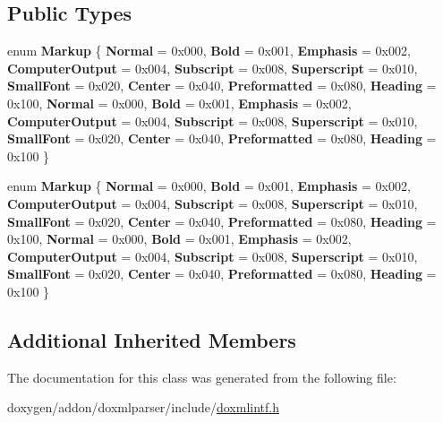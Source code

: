 \subsection*{Public Types}
\begin{DoxyCompactItemize}
\item 
\mbox{\label{class_i_doc_markup_a0f98f192394be48c4fb41b3b79e021ba}} 
enum {\bfseries Markup} \{ \newline
{\bfseries Normal} = 0x000, 
{\bfseries Bold} = 0x001, 
{\bfseries Emphasis} = 0x002, 
{\bfseries Computer\+Output} = 0x004, 
\newline
{\bfseries Subscript} = 0x008, 
{\bfseries Superscript} = 0x010, 
{\bfseries Small\+Font} = 0x020, 
{\bfseries Center} = 0x040, 
\newline
{\bfseries Preformatted} = 0x080, 
{\bfseries Heading} = 0x100, 
{\bfseries Normal} = 0x000, 
{\bfseries Bold} = 0x001, 
\newline
{\bfseries Emphasis} = 0x002, 
{\bfseries Computer\+Output} = 0x004, 
{\bfseries Subscript} = 0x008, 
{\bfseries Superscript} = 0x010, 
\newline
{\bfseries Small\+Font} = 0x020, 
{\bfseries Center} = 0x040, 
{\bfseries Preformatted} = 0x080, 
{\bfseries Heading} = 0x100
 \}
\item 
\mbox{\label{class_i_doc_markup_a0f98f192394be48c4fb41b3b79e021ba}} 
enum {\bfseries Markup} \{ \newline
{\bfseries Normal} = 0x000, 
{\bfseries Bold} = 0x001, 
{\bfseries Emphasis} = 0x002, 
{\bfseries Computer\+Output} = 0x004, 
\newline
{\bfseries Subscript} = 0x008, 
{\bfseries Superscript} = 0x010, 
{\bfseries Small\+Font} = 0x020, 
{\bfseries Center} = 0x040, 
\newline
{\bfseries Preformatted} = 0x080, 
{\bfseries Heading} = 0x100, 
{\bfseries Normal} = 0x000, 
{\bfseries Bold} = 0x001, 
\newline
{\bfseries Emphasis} = 0x002, 
{\bfseries Computer\+Output} = 0x004, 
{\bfseries Subscript} = 0x008, 
{\bfseries Superscript} = 0x010, 
\newline
{\bfseries Small\+Font} = 0x020, 
{\bfseries Center} = 0x040, 
{\bfseries Preformatted} = 0x080, 
{\bfseries Heading} = 0x100
 \}
\end{DoxyCompactItemize}
\subsection*{Additional Inherited Members}


The documentation for this class was generated from the following file\+:\begin{DoxyCompactItemize}
\item 
doxygen/addon/doxmlparser/include/\mbox{\hyperlink{include_2doxmlintf_8h}{doxmlintf.\+h}}\end{DoxyCompactItemize}
